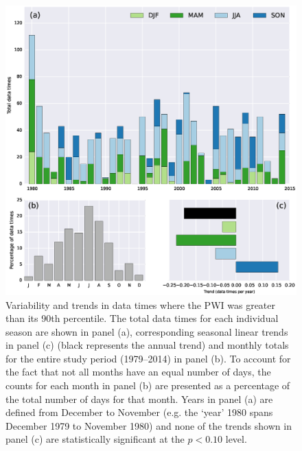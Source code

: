 \begin{figure}
\begin{center}
\includegraphics[width=0.7\columnwidth]{figures/zonalwaves/dates-summary_pwigt90pct_ERAInterim_500hPa_030day-runmean_native.eps}
\caption[Variability and trends in data times where the PWI was greater than its 90th percentile]{\label{fig:annual_distribution}
Variability and trends in data times where the PWI was greater than its 90th percentile. The total data times for each individual season are shown in panel (a), corresponding seasonal linear trends in panel (c) (black represents the annual trend) and monthly totals for the entire study period (1979--2014) in panel (b). To account for the fact that not all months have an equal number of days, the counts for each month in panel (b) are presented as a percentage of the total number of days for that month. Years in panel (a) are defined from December to November (e.g. the `year' 1980 spans December 1979 to November 1980) and none of the trends shown in panel (c) are statistically significant at the $p < 0.10$ level.}
\end{center}
\end{figure}

